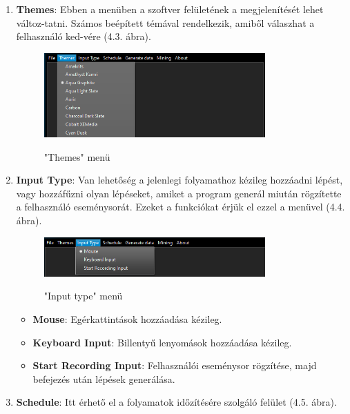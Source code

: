 \begin{enumerate}
{	}
	\item{
		\textbf{Themes}: Ebben a menüben a szoftver felületének a megjelenítését lehet változ\hyp{}tatni. Számos beépített témával rendelkezik, amiből válaszhat a felhasználó ked\hyp{}vére (4.3. ábra).
		\begin{figure}[h]
			\begin{center}
				\includegraphics[width=0.8\textwidth, keepaspectratio=true]{images/img_ui_themes}\\
				\caption{"Themes" menü}
				\label{fig:example}
			\end{center}
		\end{figure}
	}
	\item{
		\textbf{Input Type}: Van lehetőség a jelenlegi folyamathoz kézileg hozzáadni lépést, vagy hozzáfűzni olyan lépéseket, amiket a program generál miután rögzítette a felhasználó eseménysorát. Ezeket a funkciókat érjük el ezzel a menüvel (4.4. ábra).
		\begin{figure}[h]
			\begin{center}
				\includegraphics[width=0.8\textwidth, keepaspectratio=true]{images/img_ui_input}\\
				\caption{"Input type" menü}
				\label{fig:example}
			\end{center}
		\end{figure}
		\begin{itemize}
			\item{\textbf{Mouse}: Egérkattintások hozzáadása kézileg.}
			\item{\textbf{Keyboard Input}: Billentyű lenyomások hozzáadása kézileg.}
			\item{\textbf{Start Recording Input}: Felhasználói eseménysor rögzítése, majd befejezés után lépések generálása.}
		\end{itemize}
	}
	\item{
		\textbf{Schedule}: Itt érhető el a folyamatok időzítésére szolgáló felület (4.5. ábra).
}
\end{enumerate}
